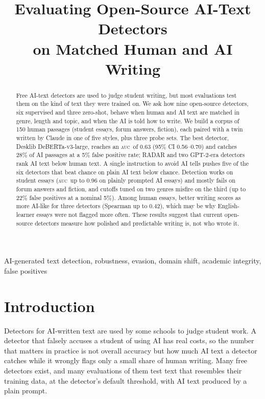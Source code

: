 \documentclass[conference]{IEEEtran}
\newcommand{\auc}{\textsc{auc}}
\begin{document}
\title{Evaluating Open-Source AI-Text Detectors\\on Matched Human and AI Writing}

\author{
}

\maketitle

\begin{abstract}
Free AI-text detectors are used to judge student writing, but most evaluations test them on the kind of text they were trained on. We ask how nine open-source detectors, six supervised and three zero-shot, behave when human and AI text are matched in genre, length and topic, and when the AI is told how to write. We build a corpus of 150 human passages (student essays, forum answers, fiction), each paired with a twin written by Claude in one of five styles, plus three probe sets. The best detector, Desklib DeBERTa-v3-large, reaches an \auc\ of 0.63 (95\% CI 0.56--0.70) and catches 28\% of AI passages at a 5\% false positive rate; RADAR and two GPT-2-era detectors rank AI text below human text. A single instruction to avoid AI tells pushes five of the six detectors that beat chance on plain AI text below chance. Detection works on student essays (\auc\ up to 0.96 on plainly prompted AI essays) and mostly fails on forum answers and fiction, and cutoffs tuned on two genres misfire on the third (up to 22\% false positives at a nominal 5\%). Among human essays, better writing scores as more AI-like for three detectors (Spearman up to 0.42), which may be why English-learner essays were not flagged more often. These results suggest that current open-source detectors measure how polished and predictable writing is, not who wrote it.
\end{abstract}

\begin{IEEEkeywords}
AI-generated text detection, robustness, evasion, domain shift, academic integrity, false positives
\end{IEEEkeywords}

\section{Introduction}
Detectors for AI-written text are used by some schools to judge student work. A detector that falsely accuses a student of using AI has real costs, so the number that matters in practice is not overall accuracy but how much AI text a detector catches while it wrongly flags only a small share of human writing. Many free detectors exist, and many evaluations of them test text that resembles their training data, at the detector's default threshold, with AI text produced by a plain prompt.
\end{document}
